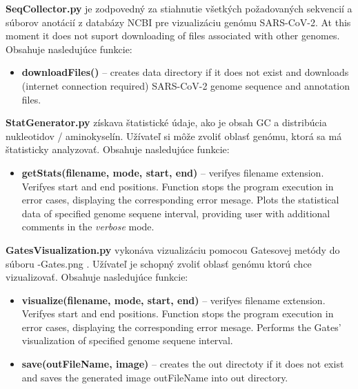 \textbf{\selectfont SeqCollector.py} je zodpovedný za stiahnutie všetkých požadovaných sekvencií a súborov anotácií z databázy NCBI pre vizualizáciu genómu SARS-CoV-2.
At this moment it does not suport downloading of files associated with other genomes.
Obsahuje nasledujúce funkcie:
\begin{itemize}
  \item \textbf{\selectfont downloadFiles()} -- creates {\selectfont data} directory if it does not exist and downloads (internet connection required) SARS-CoV-2 genome sequence and annotation files.
\end{itemize}



\textbf{\selectfont StatGenerator.py} získava štatistické údaje, ako je obsah GC a distribúcia nukleotidov / aminokyselín.
Užívateľ si môže zvoliť oblasť genómu, ktorá sa má štatisticky analyzovať.
Obsahuje nasledujúce funkcie:
\begin{itemize}
  \item \textbf{\selectfont getStats(filename, mode, start, end)} -- verifyes {\selectfont filename} extension. Verifyes {\selectfont start} and {\selectfont end} positions. Function stops the program execution in error cases, displaying the corresponding error mesage. Plots the statistical data of specified genome sequene interval, providing user with additional comments in the \textit{verbose} mode.
\end{itemize}



\textbf{\selectfont GatesVisualization.py} vykonáva vizualizáciu pomocou Gatesovej metódy do súboru {\selectfont -Gates.png} .
Užívateľ je schopný zvoliť oblasť genómu ktorú chce vizualizovať.
Obsahuje nasledujúce funkcie:
\begin{itemize}
  \item \textbf{\selectfont visualize(filename, mode, start, end)} -- verifyes {\selectfont filename} extension. Verifyes {\selectfont start} and {\selectfont end} positions. Function stops the program execution in error cases, displaying the corresponding error mesage. Performs the Gates' visualization of specified genome sequene interval.
  \item \textbf{\selectfont save(outFileName, image)} -- creates the {\selectfont out} directoty if it does not exist and saves the generated image {\selectfont outFileName} into {\selectfont out} directory.
\end{itemize}



